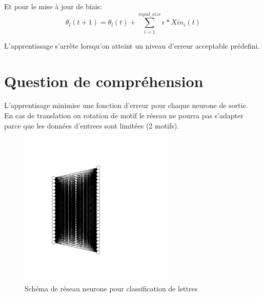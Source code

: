 \documentclass {article}
\begin{document}
Et pour le mise à jour de biais:
\begin{equation}
   \theta_{l}(t+1) = \theta_{l}(t) + \sum_{i=1}^{input\_size}\epsilon * Xin_{i}(t)
\end{equation}

L'apprentissage s'arrête lorsqu'on atteint un niveau d'erreur acceptable
prédefini.

\section{Question de compréhension}
L'apprentisage minimise une fonction d'erreur pour chaque neurone de sortie.\\

En cas de translation ou rotation de motif le réseau ne pourra pas s'adapter
parce que les données d'entrees sont limitées (2 motifs).

\begin{figure}[H]
   \centering
   \includegraphics[height=20em]{AZnn.pdf}
   \caption{Schéma de réseau neurone pour classification de lettres}
\end{figure}
\end{document}
